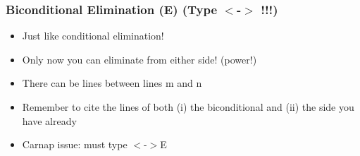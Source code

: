 \begin{frame}
  \frametitle{Biconditional  Elimination (\eiff E)     (Type $<$-$>$ !!!)}
  
\begin{multicols}{2}

\begin{center}
    \begin{fitchproof}
	 
\end{fitchproof}

\begin{fitchproof}
	 
\end{fitchproof}

    \end{center}
  
   
   \columnbreak
    
\begin{center}

 \begin{itemize}[<+->]

\item Just like conditional elimination! 

\item Only now you can eliminate from either side! (power!)

\item There can be lines between lines m and n

\item Remember to cite the lines of both (i) the biconditional and (ii) the side you have already

\item Carnap issue: must type $<$-$>$E 

\end{itemize}
  \end{center}
\end{multicols}

\end{frame}

